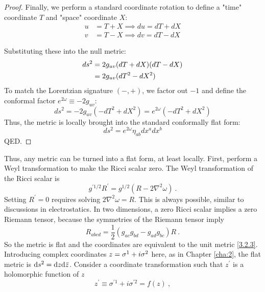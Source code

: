 \begin{tcolorbox}[breakable]
\begin{proof}
		Finally, we perform a standard coordinate rotation to define a "time" coordinate $T$ and "space" coordinate $X$:
		\begin{align}
			u &= T + X \implies du = dT + dX \\
			v &= T - X \implies dv = dT - dX
		\end{align}
		
		Substituting these into the null metric:
		\begin{align}
			ds^2 &= 2g_{uv} (dT + dX)(dT - dX) \notag\\
			&= 2g_{uv} (dT^2 - dX^2)
		\end{align}
		To match the Lorentzian signature $(-, +)$, we factor out $-1$ and define the conformal factor $e^{2\omega} \equiv -2g_{uv}$:
		\begin{equation}
			ds^2 = -2g_{uv} (-dT^2 + dX^2) = e^{2\omega} (-dT^2 + dX^2)
		\end{equation}
		Thus, the metric is locally brought into the standard conformally flat form:
		\begin{equation}
			ds^2 = e^{2\omega} \eta_{ab} dx^a dx^b
		\end{equation}
		QED.
	\end{proof}
\end{tcolorbox}
Thus, any metric can be turned into a flat form, at least locally. First, perform a Weyl transformation to make the Ricci scalar zero.    
The Weyl transformation of the Ricci scalar is    
\begin{equation}\label{3.3.5}
	g^{\prime 1 / 2} R^{\prime}=g^{1 / 2}\left(R-2 \nabla^{2} \omega\right) \:.
\end{equation}
Setting $R^{\prime}=0$ requires solving $2 \nabla^{2} \omega=R$. This is always possible, similar to discussions in electrostatics.    
In two dimensions, a zero Ricci scalar implies a zero Riemann tensor, because the symmetries of the Riemann tensor imply    
\begin{equation}
	R_{a b c d}=\frac{1}{2}(g_{a c} g_{b d}-g_{a d} g_{b c}) R  \:. \label{3.3.6}
\end{equation}
So the metric is flat and the coordinates are equivalent to the unit metric \eqref{3.2.3}.    
Introducing complex coordinates $z=\sigma^{1}+i \sigma^{2}$ here, as in Chapter \ref{cha:2}, the flat metric is $\mathrm{d} s^{2}=\mathrm{d} z \mathrm{d} \bar{z}$. Consider a coordinate transformation such that $z^\prime$ is a holomorphic function of $z$    
\begin{equation}\label{3.3.7}
	z^{\prime} \equiv \sigma^{\prime 1}+i \sigma^{\prime 2}=f(z) \:, 
\end{equation}
